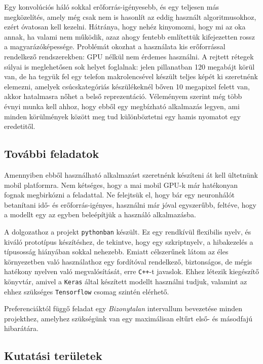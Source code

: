 Egy konvolúciós háló sokkal erőforrás-igényesebb, és egy teljesen más megközelítés,
amely még csak nem is hasonlít az eddig használt algoritmusokhoz, ezért óvatosan kell 
kezelni. Hátránya, hogy nehéz kinyomozni, hogy mi az oka annak, ha valami nem működik,
azaz ahogy fentebb említettük
kifejezetten rossz a magyarázóképessége. Problémát okozhat a használata kis erőforrással 
rendelkező rendszerekben: GPU nélkül nem érdemes használni. A rejtett rétegek súlyai is 
meglehetősen sok helyet foglalnak: jelen pillanatban 120 megabájt körül van, de ha tegyük
fel egy telefon makrolencsével készült teljes képét ki szeretnénk elemezni, 
amelyek csúcskategóriás készülékeknél bőven 10 megapixel felett van, akkor hatalmasra 
nőhet a belső reprezentáció. Véleményem szerint még több évnyi munka kell ahhoz, hogy 
ebből egy megbízható alkalmazás legyen, ami minden körülmények között meg tud 
különböztetni egy hamis nyomatot egy eredetitől.


\subsection{További feladatok}

Amennyiben ebből használható alkalmazást szeretnénk készíteni át kell ültetnünk mobil 
platformra. Nem kétséges, hogy a mai mobil GPU-k már hatékonyan fognak megbirkózni a
feladattal. Ne felejtsük el, hogy bár egy neuronhálót betanítani idő- és erőforrás-igényes,
használni már jóval egyszerűbb, feltéve, hogy a modellt egy az egyben beleépítjük a használó
alkalmazásba.


A dolgozathoz a projekt \texttt{pythonban} készült. Ez egy rendkívül flexibilis nyelv, és
kiváló prototípus készítéshez, de tekintve, hogy egy szkriptnyelv, a hibakezelés a 
típusosság hiányában sokkal nehezebb. Emiatt célszerűnek látom az éles környezetben 
való használathoz egy fordítóval rendelkező, biztonságos, de mégis hatékony nyelven 
való megvalósítását, erre \texttt{C++}-t javaslok. Ehhez létezik kiegészítő könyvtár,
amivel a \texttt{Keras}\cite{keras} által készített modellt használni tudjuk, valamint az 
ehhez szükséges 
\texttt{Tensorflow}\cite{tensorflow} csomag szintén elérhető.


Preferenciáktól függő feladat egy \textit{Bizonytalan} intervallum bevezetése minden
projekthez, amelyhez szükségünk van egy maximálisan eltűrt első- és másodfajú hibarátára.

\subsection{Kutatási területek}

